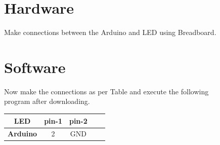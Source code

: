 \documentclass{article}
\begin{document}
\begin{figure}
\begin{multicols}{2}

\section{Hardware}

\textbf{} Make connections between the Arduino and LED using Breadboard.

\section{Software}

\textbf{} Now make the connections as per
Table and execute the following program after
downloading.

\vspace{10mm}

\vspace{10mm}
    \centering
    \begin{tabular}{ |c |c |c |c| c|}

\hline
 \textbf{LED}  & pin-1  & pin-2\\
 \hline
 \textbf{Arduino}  & 2 & GND\\  
 \hline
 \end{tabular}
 \vspace{3mm}
 



\end{multicols}
\end{figure}
\end{document}
